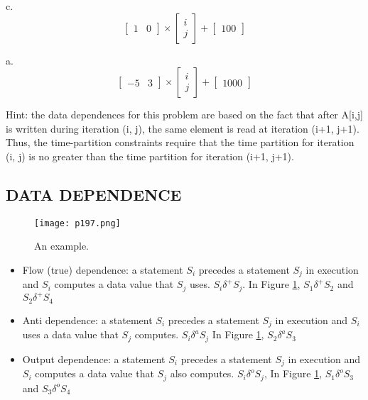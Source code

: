 \begin{problem}
\item c.
$$
	\begin{bmatrix}
		1 & 0
	\end{bmatrix}
	\times
	\begin{bmatrix}
		i \\
		j
	\end{bmatrix}
	+
	\begin{bmatrix}
		100
	\end{bmatrix}
$$
\item a.
$$
	\begin{bmatrix}
		-5 & 3
	\end{bmatrix}
	\times
	\begin{bmatrix}
		i \\
		j
	\end{bmatrix}
	+
	\begin{bmatrix}
		1000
	\end{bmatrix}
$$
\item {\color{red} Hint: the data dependences for this problem are based on the fact that after A[i,j] is written during iteration (i, j), the same element is read at iteration (i+1, j+1). Thus, the time-partition constraints require that the time partition for iteration (i, j) is no greater than the time partition for iteration (i+1, j+1). }
\end{problem}

\subsection{DATA DEPENDENCE}

\begin{figure}[H]
	\centering
	\texttt{[image: p197.png]}
	\caption{An example.}
	\label{fig:p197}
\end{figure}



\begin{itemize}
	\item Flow (true) dependence: a statement $S_i$ precedes a
	      statement $S_j$ in execution and $S_i$ computes a data value that
	      $S_j$ uses. $S_i \delta^{+} S_j$. In Figure \ref{fig:p197}, $S_1 \delta^{+} S_2$ and $S_2 \delta^{+} S_4$

	\item Anti dependence: a statement $S_i$ precedes a statement $S_j$ in
	      execution and $S_i$ uses a data value that $S_j$ computes. $S_i \delta^{a} S_j$
	      In Figure \ref{fig:p197}, $S_2 \delta^{a} S_3$

	\item Output dependence: a statement $S_i$ precedes a statement $S_j$
	      in execution and $S_i$ computes a data value that $S_j$ also
	      computes. $S_i \delta^{o} S_j$,
	      In Figure \ref{fig:p197}, $S_1 \delta^{o} S_3$ and $S_3 \delta^{o} S_4$
\end{itemize}


